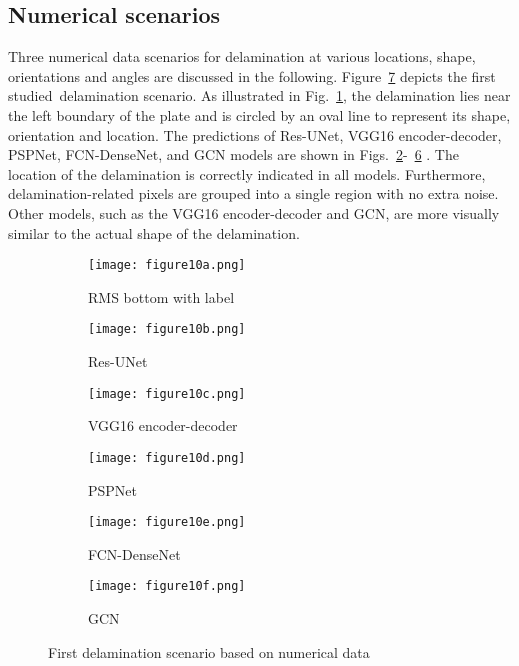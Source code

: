 \subsection{Numerical scenarios}
Three numerical data scenarios for delamination at various locations, shape, orientations and angles are discussed in the following.
Figure~\ref{fig:softmax_448} depicts the first studied delamination scenario.
As illustrated in Fig.~\ref{fig:RMS_flat_shell_Vz_448}, the delamination lies near the left boundary of the plate and is circled by an oval line to represent its shape, orientation and location.
The predictions of Res-UNet, VGG16 encoder-decoder, PSPNet, FCN-DenseNet, and GCN models are shown in Figs.~\ref{fig:unet_pred_448}-~\ref{fig:gcn_pred_448} .
The location of the delamination is correctly indicated in all models.
Furthermore, delamination-related pixels are grouped into a single region with no extra noise.
Other models, such as the VGG16 encoder-decoder and GCN, are more visually similar to the actual shape of the delamination.
\begin{figure}[!h]
	\centering
	\begin{subfigure}[b]{0.47\textwidth}
		\centering
		\texttt{[image: figure10a.png]}
		\caption{RMS bottom with label}
		\label{fig:RMS_flat_shell_Vz_448}
	\end{subfigure}
	\hfill
	\begin{subfigure}[b]{0.47\textwidth}
		\centering
		\texttt{[image: figure10b.png]}
		\caption{Res-UNet}
		\label{fig:unet_pred_448}
	\end{subfigure}
	\hfill
	\begin{subfigure}[b]{0.47\textwidth}
		\centering
		\texttt{[image: figure10c.png]}
		\caption{VGG16 encoder-decoder}
		\label{fig:vgg16_pred_448}
	\end{subfigure}
	\hfill
	\begin{subfigure}[b]{0.47\textwidth}
		\centering
		\texttt{[image: figure10d.png]}
		\caption{PSPNet}
		\label{fig:pspnet_pred_448}
	\end{subfigure}
	\hfill
	\begin{subfigure}[b]{0.47\textwidth}
		\centering
		\texttt{[image: figure10e.png]}
		\caption{FCN-DenseNet}
		\label{fig:fcn_densenet_pred_448}
	\end{subfigure}
	\hfill
	\begin{subfigure}[b]{0.47\textwidth}
		\centering
		\texttt{[image: figure10f.png]}
		\caption{GCN}
		\label{fig:gcn_pred_448}
	\end{subfigure}
	\caption{First delamination scenario based on numerical data}
	\label{fig:softmax_448}
\end{figure} 
\clearpage

